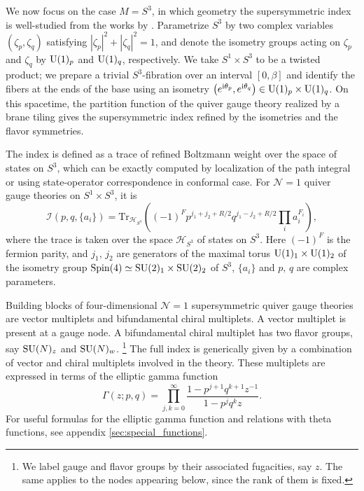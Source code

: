 We now focus on the case $M=S^{3}$, in which geometry the supersymmetric
index is well-studied from the works by \cite{Romelsberger:2005eg,Kinney:2005ej,Festuccia:2011ws}.
Parametrize $S^{3}$ by two complex variables
$(\zeta_{p},\zeta_{q})$ satisfying $|\zeta_{p}|^{2}+|\zeta_{q}|^{2}=1$,
and denote the isometry groups acting on $\zeta_{p}$ and $\zeta_{q}$
by $\mathrm{U}(1)_{p}$ and $\mathrm{U}(1)_{q}$, respectively. We take $S^{1}\times S^{3}$
to be a twisted product; we prepare a trivial $S^{3}$-fibration over
an interval $[0,\beta]$ and identify the fibers at the ends of the
base using an isometry $\left(e^{\mathrm{i}\theta_{p}},e^{\mathrm{i}\theta_{q}}\right)\in \mathrm{U}(1)_{p}\times \mathrm{U}(1)_{q}$.
On this spacetime, the partition function of the quiver gauge theory
realized by a brane tiling gives the supersymmetric index refined
by the isometries and the flavor symmetries.

The index is defined as a trace of refined Boltzmann weight over the
space of states on $S^{3}$, which can be exactly computed by localization of the path integral
or using state-operator correspondence in conformal case.
For $\mathcal{N}=1$ quiver gauge theories on $S^{1}\times S^{3}$, it is
\begin{equation}
    \mathcal{I}(p,q,\{ a_{i}\} )
      =  \mathrm{Tr}_{\mathcal{H}_{S^{3}}}
      \left(    (-1)^{F}  p^{j_{1}+j_{2}+R/2}  q^{j_{1}-j_{2}+R/2}  \prod_{i}a_{i}^{F_{i}}    \right),
\end{equation}
where the trace is taken over the space $\mathcal{H}_{S^{3}}$ of states on $S^{3}$.
Here $\left(-1\right)^{F}$ is the fermion parity, and $j_{1},\,j_{2}$
are generators of the maximal torus $\mathrm{U}(1)_{1}\times \mathrm{U}(1)_{2}$ of
the isometry group $\mathrm{Spin}(4)\simeq \mathrm{SU}(2)_{1}\times \mathrm{SU}(2)_{2}$ of $S^{3}$,
$\{ a_i \}$ and $p,\,q$ are complex parameters.


Building blocks of four-dimensional $\mathcal{N}=1$ supersymmetric quiver gauge
theories are vector multiplets and bifundamental chiral multiplets.
A vector multiplet is present at a gauge node. A bifundamental chiral
multiplet has two flavor groups, say $\mathrm{SU}(N)_{z}$ and $\mathrm{SU}(N)_{w}$.%
%
\footnote{We label gauge and flavor groups by their associated fugacities, say $z$.
The same applies to the nodes appearing below, since the rank of them is fixed.}
%
The full index is generically given by a combination of vector and chiral
multiplets involved in the theory. These multiplets are expressed
in terms of the elliptic gamma function
\begin{equation}
    \Gamma(z;p,q)  =  \prod_{j,k=0}^{\infty}  \frac{1-p^{j+1}q^{k+1}z^{-1}}{1-p^{j}q^{k}z}
  .
\end{equation}
For useful formulas for the elliptic gamma function and
relations with theta functions, see appendix \ref{sec:special_functions}.




